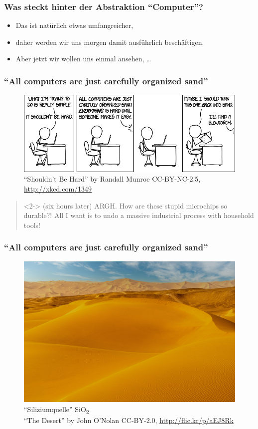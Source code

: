\begin{frame}
	\frametitle{Was steckt hinter der Abstraktion ``Computer''?}

	\begin{itemize}
		\item Das ist natürlich etwas umfangreicher,
		\item daher werden wir uns morgen damit ausführlich beschäftigen.
		\item Aber jetzt wir wollen uns einmal ansehen, \ldots
	\end{itemize}

\end{frame}



\begin{frame}
	\frametitle{``All computers are just carefully organized sand''}
	\begin{figure}
		\centering
		\includegraphics[width=.8\textwidth]{images/shouldnt_be_hard.png}
		\caption{``Shouldn't Be Hard'' by Randall Munroe
		CC-BY-NC-2.5, \url{http://xkcd.com/1349}}
	\end{figure}

	\begin{quote}<2->
		(six hours later) ARGH. How are these stupid microchips so durable?!
		All I want is to undo a massive industrial process with household
		tools!
	\end{quote}
\end{frame}

\begin{frame}
	\frametitle{``All computers are just carefully organized sand''}

	\begin{figure}
		\centering
		\includegraphics[width=.7\textwidth]{images/the_desert.jpeg}
		\caption{``Siliziumquelle'' SiO\textsubscript{2} \\
		``The Desert'' by John O'Nolan
		CC-BY-2.0, \url{http://flic.kr/p/aEJ8Rk}}
	\end{figure}
\end{frame}

